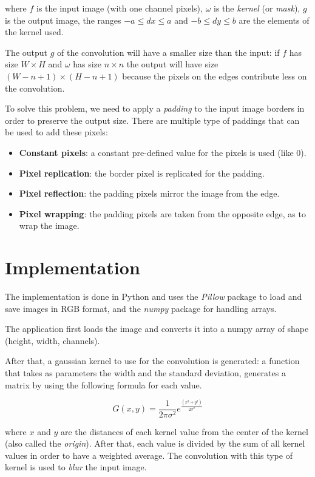 \documentclass[10pt,twocolumn,letterpaper]{article}
\begin{document}
where $f$ is the input image (with one channel pixels), $\omega$ is the \textit{kernel} (or \textit{mask}), $g$ is the output image, the ranges $-a \leq dx \leq a$ and $-b \leq dy \leq b$ are the elements of the kernel used.

The output $g$ of the convolution will have a smaller size than the input: if $f$ has size $W \times H$ and $\omega$ has size $n \times n$ the output will have size $(W - n + 1) \times (H - n + 1)$ because the pixels on the edges contribute less on the convolution. 

To solve this problem, we need to apply a \textit{padding} to the input image borders in order to preserve the output size. There are multiple type of paddings that can be used to add these pixels: 

\begin{itemize}
	\item \textbf{Constant pixels}: a constant pre-defined value for the pixels is used (like 0).
	\item \textbf{Pixel replication}: the border pixel is replicated for the padding.
	\item \textbf{Pixel reflection}: the padding pixels mirror the image from the edge.
	\item \textbf{Pixel wrapping}: the padding pixels are taken from the opposite edge, as to wrap the image.
\end{itemize} 

\section{Implementation}

The implementation is done in Python and uses the \textit{Pillow} package to load and save images in RGB format, and the \textit{numpy} package for handling arrays. 

The application first loads the image and converts it into a numpy array of shape (height, width, channels).

After that, a gaussian kernel to use for the convolution is generated: a function that takes as parameters the width and the standard deviation, generates a matrix by using the following formula for each value.

\[G(x, y) = \frac{1}{2\pi\sigma^2}e^{\frac{(x^2 + y^2)}{2\sigma^2}}\]

where $x$ and $y$ are the distances of each kernel value from the center of the kernel (also called the \textit{origin}). After that, each value is divided by the sum of all kernel values in order to have a weighted average.
The convolution with this type of kernel is used to \textit{blur} the input image.
\end{document}
